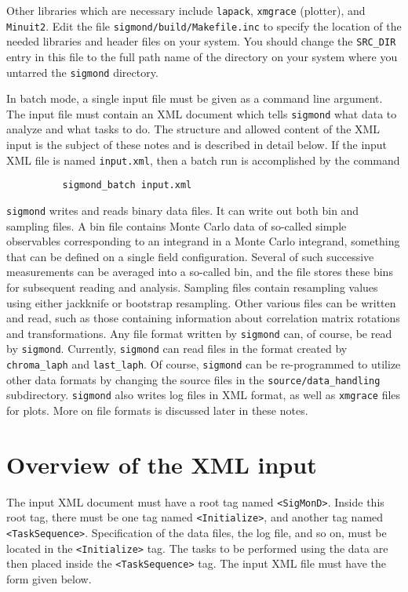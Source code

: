 \documentclass[12pt]{article}
\newcommand{\sigmond}{\texttt{sigmond} }
\newcommand{\vb}{\texttt}
\begin{document}
Other libraries which are necessary include \vb{lapack}, \vb{xmgrace} (plotter), 
and \vb{Minuit2}.
Edit the file
\vb{sigmond/build/Makefile.inc} to specify the location of the needed
libraries and header files on your system.  You should change the \vb{SRC\_DIR}
entry in this file to the full path name of the directory on your system
where you untarred the \vb{sigmond} directory.

In batch mode, a single input file must be given as a command line
argument.  The input file must contain an XML document which
tells \sigmond what data to analyze and what tasks to do.  The structure
and allowed content of the XML input is the subject of these notes and
is described in detail below.  If the input XML file is named
\vb{input.xml}, then a batch run is accomplished by the command
\begin{verbatim}
          sigmond_batch input.xml
\end{verbatim}


\vb{sigmond} writes and reads binary data files.  It can write out
both bin and sampling files.  A bin file contains Monte Carlo data
of so-called simple observables corresponding to an integrand in a Monte
Carlo integrand, something that can be defined on a single field
configuration.  Several of such successive measurements can be averaged
into a so-called bin, and the file stores these bins for subsequent
reading and analysis.  Sampling files contain resampling values using
either jackknife or bootstrap resampling.  Other various files can
be written and read, such as those containing information about
correlation matrix rotations and transformations.  Any file format
written by \vb{sigmond} can, of course, be read by \vb{sigmond}.
Currently, \vb{sigmond} can read files in the format created by
\vb{chroma\_laph} and \vb{last\_laph}.  Of course, \vb{sigmond} can be 
re-programmed to utilize other data formats by changing the source files 
in the \vb{source/data\_handling} subdirectory. \vb{sigmond} also writes 
log files in XML format, as well as \vb{xmgrace} files for plots.
More on file formats is discussed later in these notes.

\section{Overview of the XML input}
The input XML document must have a root tag named \vb{<SigMonD>}. 
Inside this root tag, there must be one tag named \vb{<Initialize>},
and another tag named \vb{<TaskSequence>}.  Specification of the data
files, the log file, and so on, must be located in the \vb{<Initialize>}
tag.  The tasks to be performed using the data are then placed inside
the \vb{<TaskSequence>} tag.   The input XML file must have the form
given below.    
\end{document}
